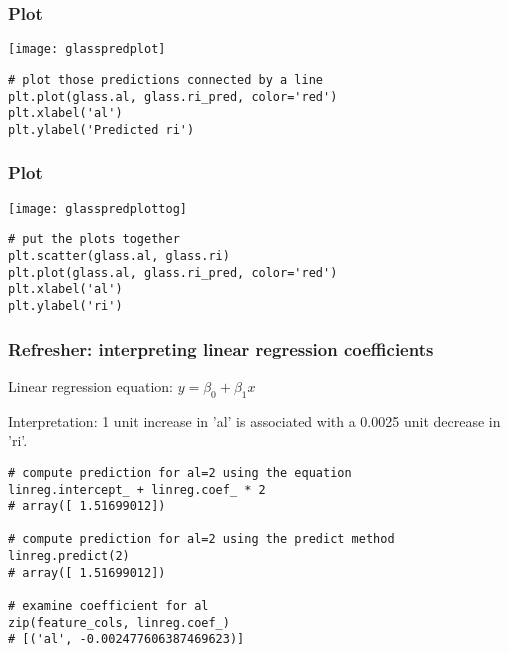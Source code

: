 \begin{frame}[fragile]\frametitle{Plot}
\begin{center}
\texttt{[image: glasspredplot]}
\end{center}


\begin{lstlisting}
# plot those predictions connected by a line
plt.plot(glass.al, glass.ri_pred, color='red')
plt.xlabel('al')
plt.ylabel('Predicted ri')
\end{lstlisting}

\end{frame}

\begin{frame}[fragile]\frametitle{Plot}

\begin{center}
\texttt{[image: glasspredplottog]}
\end{center}

\begin{lstlisting}
# put the plots together
plt.scatter(glass.al, glass.ri)
plt.plot(glass.al, glass.ri_pred, color='red')
plt.xlabel('al')
plt.ylabel('ri')
\end{lstlisting}

\end{frame}

\begin{frame}[fragile]\frametitle{Refresher: interpreting linear regression coefficients}

Linear regression equation: $ y = \beta_0 + \beta_1 x$

Interpretation: 1 unit increase in 'al' is associated with a 0.0025 unit decrease in 'ri'.
\begin{lstlisting}
# compute prediction for al=2 using the equation
linreg.intercept_ + linreg.coef_ * 2 
# array([ 1.51699012])

# compute prediction for al=2 using the predict method
linreg.predict(2) 
# array([ 1.51699012])

# examine coefficient for al
zip(feature_cols, linreg.coef_) 
# [('al', -0.002477606387469623)]
\end{lstlisting}

\end{frame}


